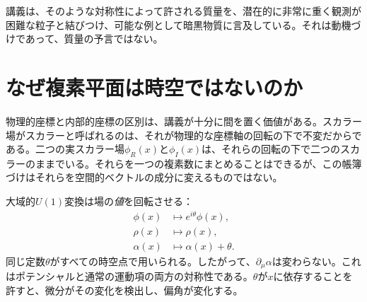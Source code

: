 講義は、そのような対称性によって許される質量を、潜在的に非常に重く観測が困難な粒子と結びつけ、可能な例として暗黒物質に言及している。それは動機づけであって、質量の予言ではない。

\begin{classroomqa}
\end{classroomqa}

\begin{classroomqa}
\end{classroomqa}

\section{なぜ複素平面は時空ではないのか}

物理的座標と内部的座標の区別は、講義が十分に間を置く価値がある。スカラー場がスカラーと呼ばれるのは、それが物理的な座標軸の回転の下で不変だからである。二つの実スカラー場\(\phi_R(x)\)と\(\phi_I(x)\)は、それらの回転の下で二つのスカラーのままでいる。それらを一つの複素数にまとめることはできるが、この帳簿づけはそれらを空間的ベクトルの成分に変えるものではない。

大域的\(U(1)\)変換は場の\emph{値}を回転させる：
\begin{equation}
\begin{aligned}
  \phi(x)&\longmapsto e^{i\theta}\phi(x),
  \\
  \rho(x)&\longmapsto\rho(x),
  \\
  \alpha(x)&\longmapsto\alpha(x)+\theta.
\end{aligned}
  \label{eq:l08-global-shift}
\end{equation}
同じ定数\(\theta\)がすべての時空点で用いられる。したがって、\(\partial_\mu\alpha\)は変わらない。これはポテンシャルと通常の運動項の両方の対称性である。\(\theta\)が\(x\)に依存することを許すと、微分がその変化を検出し、偏角が変化する。

